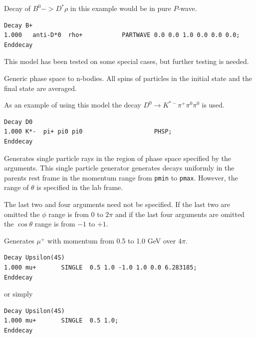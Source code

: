 \Example
Decay of $B^0->D^*\rho$ in this example would be in pure $P$-wave.
\begin{verbatim}
Decay B+
1.000   anti-D*0  rho+           PARTWAVE 0.0 0.0 1.0 0.0 0.0 0.0;
Enddecay
\end{verbatim}

\Notes
This model has been tested on
some special cases, but further testing is needed.






\label{phsp}



\Expl
Generic phase space to n-bodies. All spins of particles in
the initial state and the final state are averaged.

\Example
As an example of using this model the decay 
$D^0\rightarrow K^{*-}\pi^+\pi^0\pi^0$
is used.
\begin{verbatim}
Decay D0
1.000 K*-  pi+ pi0 pi0                    PHSP;
Enddecay
\end{verbatim}





\label{single}



\Expl
Generates single particle rays in the region of phase space 
specified by the arguments. This single particle generator 
generates decays uniformly in the parents rest frame in 
the momentum range from {\tt pmin} to {\tt pmax}. However,
the range of $\theta$ is specified in the lab frame.

The last two and four arguments need not be specified. If
the last two are omitted the $\phi$ range is from $0$ to $2\pi$
and if the last four arguments are omitted the $\cos\theta$ range
is from $-1$ to $+1$.

\Example 
Generates $\mu^+$ with momentum from 0.5 to 1.0 GeV over $4\pi$.
\begin{verbatim}
Decay Upsilon(4S)
1.000 mu+       SINGLE  0.5 1.0 -1.0 1.0 0.0 6.283185;
Enddecay
\end{verbatim}

or simply

\begin{verbatim}
Decay Upsilon(4S)
1.000 mu+       SINGLE  0.5 1.0;
Enddecay
\end{verbatim}


